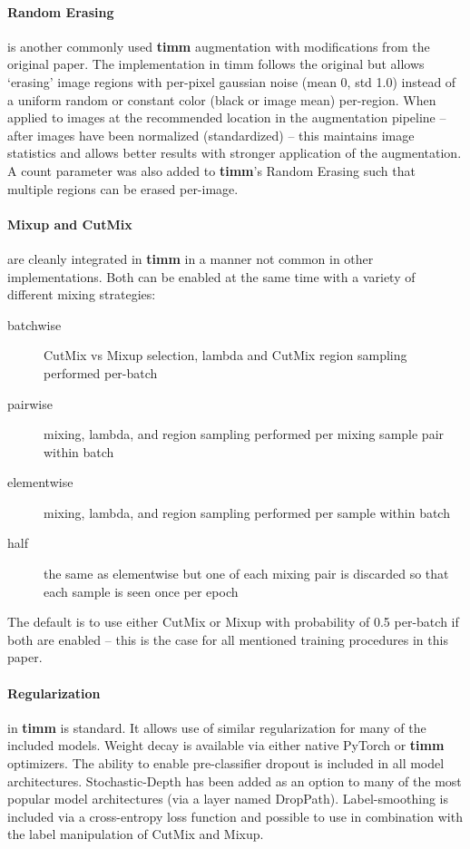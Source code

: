 \paragraph{Random Erasing} is another commonly used \textbf{timm} augmentation with modifications from the original paper. The implementation in timm follows the original but allows ‘erasing’ image regions with per-pixel gaussian noise (mean 0, std 1.0) instead of a uniform random or constant color (black or image mean) per-region. When applied to images at the recommended location in the augmentation pipeline -- after images have been normalized (standardized) -- this maintains image statistics and allows better results with stronger application of the augmentation. A count parameter was also added to \textbf{timm}’s Random Erasing such that multiple regions can be erased per-image. 

\paragraph{Mixup and CutMix} are cleanly integrated in \textbf{timm} in a manner not common in other implementations. Both can be enabled at the same time with a variety of different mixing strategies: 

\begin{description}
    \item [batchwise] CutMix vs Mixup selection, lambda and CutMix region sampling performed per-batch 
    \item [pairwise] mixing, lambda, and region sampling performed per mixing sample pair within batch
    \item [elementwise] mixing, lambda, and region sampling performed per sample within batch
    \item [half] the same as elementwise but one of each mixing pair is discarded so that each 
    sample is seen once per epoch
\end{description}

The default is to use either CutMix or Mixup with probability of 0.5 per-batch if both are enabled – this is the case for all mentioned training procedures in this paper. 

\paragraph{Regularization} in \textbf{timm} is standard. It allows use of similar regularization for many of the included models. Weight decay is available via either native PyTorch or \textbf{timm} optimizers. The ability to enable pre-classifier dropout is included in all model architectures. Stochastic-Depth has been added as an option to many of the most popular model architectures (via a layer named DropPath). Label-smoothing is included via a cross-entropy loss function and possible to use in combination with the label manipulation of CutMix and Mixup.  



